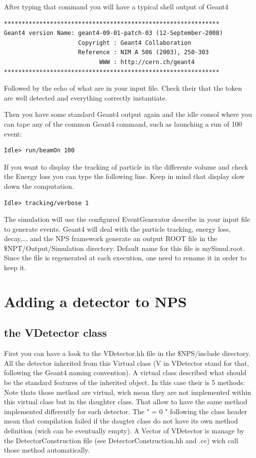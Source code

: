 \documentclass{book}
\begin{document}
After typing that command you will have a typical shell output of Geant4
\begin{verbatim}
*************************************************************
Geant4 version Name: geant4-09-01-patch-03 (12-September-2008)
                     Copyright : Geant4 Collaboration
                     Reference : NIM A 506 (2003), 250-303
                           WWW : http://cern.ch/geant4
*************************************************************
\end{verbatim}

Followed by the echo of what are in your input file. Check their that the token are well detected and everything correctly instantiate.

Then you have some standard Geant4 output again and the idle consol where you can tape any of the common Geant4 command, such as launching a run of 100 event:
\begin{verbatim}
Idle> run/beamOn 100
\end{verbatim}

If you want to display the tracking of particle in the differente volume and check the Energy loss you can type the following line. Keep in mind that display slow down the computation.

\begin{verbatim}
Idle> tracking/verbose 1
\end{verbatim}

The simulation will use the configured EventGenerator describe in your input file to generate events. Geant4 will deal with the particle tracking, energy loss, decay,... and the NPS framework generate an output ROOT file in the \$NPT/Output/Simulation directory. Default name for this file is mySimul.root. Since the file is regenerated at each execution, one need to rename it in order to keep it.

\section{ Adding a detector to NPS }

\subsection{ the VDetector class}

First you can have a look to the VDetector.hh file in the \$NPS/include directory. All the detector inherited from this Virtual class (V in VDetector stand for that, following the Geant4 naming convention). A virtual class described what should be the standard features of the inherited object. In this case their is 5 methods: Note thats those method are virtual, wich mean they are not implemented within this virtual class but in the daughter class. That allow to have the same method implemented differently for each detector. The " = 0 " following the class header mean that compilation failed if the daugter class do not have its own method definition (wich can be eventually empty). A Vector of VDetector is manage by the DetectorConstruction file (see DetectorConstruction.hh and .cc) wich call those method automatically.
\end{document}
